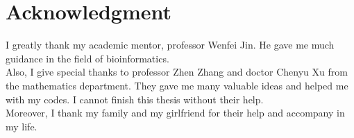 \section{Acknowledgment}
I greatly thank my academic mentor, professor Wenfei Jin. He gave me much guidance in the field of bioinformatics. \\
Also, I give special thanks to professor Zhen Zhang and doctor Chenyu Xu from the mathematics department. They gave me many valuable ideas and helped me with my codes. I cannot finish this thesis without their help. \\
Moreover, I thank my family and my girlfriend for their help and accompany in my life.